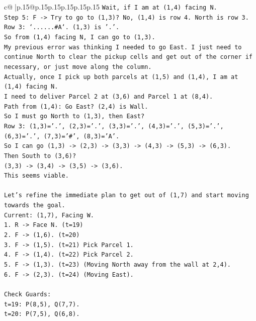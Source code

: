 \documentclass{article}
\begin{document}
{\begin{supertabular}{c@{$\;$}|p{.15\linewidth}@{}p{.15\linewidth}p{.15\linewidth}p{.15\linewidth}p{.15\linewidth}p{.15\linewidth}}
{{{\texttt{Wait, if I am at (1,4) facing N.} \\
\texttt{Step 5: F {-}> Try to go to (1,3)? No, (1,4) is row 4. North is row 3.} \\
\texttt{Row 3: `......\#A`. (1,3) is '.'.} \\
\texttt{So from (1,4) facing N, I can go to (1,3).} \\
\texttt{My previous error was thinking I needed to go East. I just need to continue North to clear the pickup cells and get out of the corner if necessary, or just move along the column.} \\
\texttt{Actually, once I pick up both parcels at (1,5) and (1,4), I am at (1,4) facing N.} \\
\texttt{I need to deliver Parcel 2 at (3,6) and Parcel 1 at (8,4).} \\
\texttt{Path from (1,4): Go East? (2,4) is Wall.} \\
\texttt{So I must go North to (1,3), then East?} \\
\texttt{Row 3: (1,3)='.', (2,3)='.', (3,3)='.', (4,3)='.', (5,3)='.', (6,3)='.', (7,3)='\#', (8,3)='A'.} \\
\texttt{So I can go (1,3) {-}> (2,3) {-}> (3,3) {-}> (4,3) {-}> (5,3) {-}> (6,3).} \\
\texttt{Then South to (3,6)?} \\
\texttt{(3,3) {-}> (3,4) {-}> (3,5) {-}> (3,6).} \\
\texttt{This seems viable.} \\
\\ 
\texttt{Let's refine the immediate plan to get out of (1,7) and start moving towards the goal.} \\
\texttt{Current: (1,7), Facing W.} \\
\texttt{1. R {-}> Face N. (t=19)} \\
\texttt{2. F {-}> (1,6). (t=20)} \\
\texttt{3. F {-}> (1,5). (t=21) Pick Parcel 1.} \\
\texttt{4. F {-}> (1,4). (t=22) Pick Parcel 2.} \\
\texttt{5. F {-}> (1,3). (t=23) (Moving North away from the wall at 2,4).} \\
\texttt{6. F {-}> (2,3). (t=24) (Moving East).} \\
\\ 
\texttt{Check Guards:} \\
\texttt{t=19: P(8,5), Q(7,7).} \\
\texttt{t=20: P(7,5), Q(6,8).} \\
}}}
\end{supertabular}}
\end{document}
